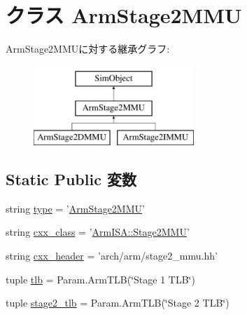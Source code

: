 \hypertarget{classArmTLB_1_1ArmStage2MMU}{
\section{クラス ArmStage2MMU}
\label{classArmTLB_1_1ArmStage2MMU}
}
ArmStage2MMUに対する継承グラフ:\begin{figure}[H]
\begin{center}
\leavevmode
\includegraphics[height=3cm]{classArmTLB_1_1ArmStage2MMU}
\end{center}
\end{figure}
\subsection*{Static Public 変数}
\begin{DoxyCompactItemize}
\item 
string \hyperlink{classArmTLB_1_1ArmStage2MMU_acce15679d830831b0bbe8ebc2a60b2ca}{type} = '\hyperlink{classArmTLB_1_1ArmStage2MMU}{ArmStage2MMU}'
\item 
string \hyperlink{classArmTLB_1_1ArmStage2MMU_a58cd55cd4023648e138237cfc0822ae3}{cxx\_\-class} = '\hyperlink{classArmISA_1_1Stage2MMU}{ArmISA::Stage2MMU}'
\item 
string \hyperlink{classArmTLB_1_1ArmStage2MMU_a17da7064bc5c518791f0c891eff05fda}{cxx\_\-header} = 'arch/arm/stage2\_\-mmu.hh'
\item 
tuple \hyperlink{classArmTLB_1_1ArmStage2MMU_abccbff0f41ec90da875f4c4782845f8c}{tlb} = Param.ArmTLB(\char`\"{}Stage 1 TLB\char`\"{})
\item 
tuple \hyperlink{classArmTLB_1_1ArmStage2MMU_a9909fd406bc2a10a29e8593c7fccf8b4}{stage2\_\-tlb} = Param.ArmTLB(\char`\"{}Stage 2 TLB\char`\"{})
\end{DoxyCompactItemize}



